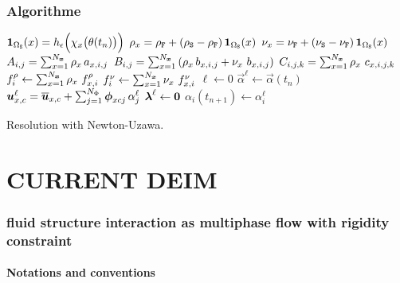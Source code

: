 \documentclass[10pt,a4paper]{article}
\begin{document}
\section{Algorithme}
\begin{algorithm}[H]
$\boldsymbol 1_{\Omega_{\mathtt{S}}}(x)= h_{\epsilon}\Big(\chi_x\big(\theta(t_{n})\big)\Big)$\;
$\rho_x = \rho_{\mathtt{F}} + (\rho_{\mathtt{S}}-\rho_{\mathtt{F}})\,\boldsymbol 1_{\Omega_{\mathtt{S}}}(x)$ \;
$\nu_x = \nu_{\mathtt{F}} + (\nu_{\mathtt{S}}-\nu_{\mathtt{F}})\,\boldsymbol 1_{\Omega_{\mathtt{S}}}(x)$ \;
$A_{i,j} = \sum_{x=1}^{N_{\boldsymbol{x}}}\rho_x\,a_{x, i,j}$ \;
$B_{i,j} = \sum_{x=1}^{N_{\boldsymbol{x}}}\left(\rho_x\,b_{x,i,j}+\nu_x\,\,b_{x, i,j}\right)$ \;
$C_{i,j,k} = \sum_{x=1}^{N_{\boldsymbol{x}}}\rho_x\,\,c_{x, i,j,k}$ \;
$f^\rho_{i} \leftarrow \sum_{x=1}^{N_{\boldsymbol{x}}}\rho_x\,\,f^\rho_{x, i}$\;
$f^\nu_{i} \leftarrow \sum_{x=1}^{N_{\boldsymbol{x}}}\nu_x\,\,f^\nu_{x, i}$\;
\;
$\ell\leftarrow 0$\;
$\vec\alpha ^{\ell} \leftarrow \vec \alpha (t_{n})$\;
$\boldsymbol{u}^{\ell}_{x, c} = \overline{\boldsymbol{u}}_{x, c}+\sum_{j=1}^{N_\Phi}\boldsymbol{\phi}_{xcj}\,\alpha_j^{\ell} $\;
$\boldsymbol{\lambda}^{\ell} \leftarrow \boldsymbol{0}$\; 
$\alpha_i(t_{n+1}) \leftarrow \alpha_i^{\ell}$\;
 \caption{Resolution with Newton-Uzawa.}
\end{algorithm}

\part{CURRENT DEIM}
%
%
\section{fluid structure interaction as multiphase flow with rigidity constraint}%
%
\cf \cite{patankar2000new}
%
\subsection{Notations and conventions}
\end{document}
